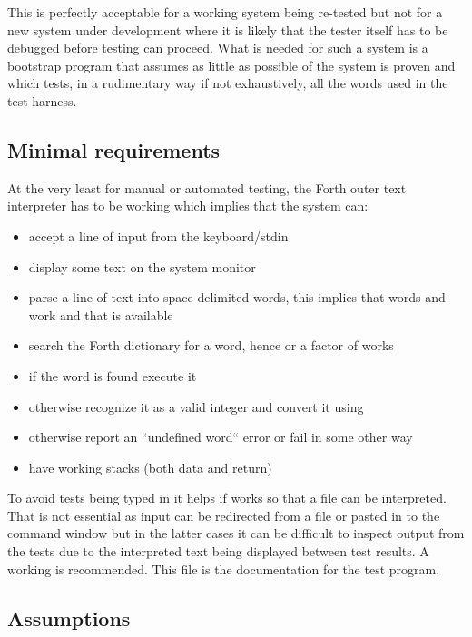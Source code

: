 This is perfectly acceptable for a working system being re-tested but
not for a new system under development where it is likely that the
tester itself has to be debugged before testing can proceed. What is
needed for such a system is a bootstrap program that assumes as
little as possible of the system is proven and which tests, in a
rudimentary way if not exhaustively, all the words used in the
test harness.

\subsection{Minimal requirements}

At the very least for manual or automated testing, the Forth outer text
interpreter has to be working which implies that the system can:

\begin{itemize}
\item accept a line of input from the keyboard/stdin
\item display some text on the system monitor
\item parse a line of text into space delimited words,
	this implies that words  and  work and
	that  is available
\item search the Forth dictionary for a word,
	hence  or a factor of  works
\item if the word is found execute it
\item otherwise recognize it as a valid integer and convert it using
\item otherwise report an ``undefined word`` error or fail in some other way
\item have working stacks (both data and return)
\end{itemize}
 
To avoid tests being typed in it helps if 
works so that a file can be interpreted. That is not essential as
input can be redirected from a file or pasted in to the command
window but in the latter cases it can be difficult to inspect output
from the tests due to the interpreted text being displayed
between test results. A working  is
recommended. This file is the documentation for the test program.

\subsection{Assumptions}

